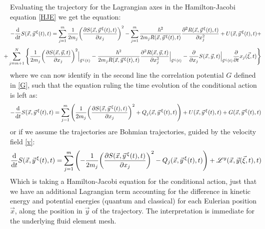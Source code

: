 \documentclass[11pt, a4paper]{article} %
\newcommand{\Lg}{\mathscr{L}}
\begin{document}
Evaluating the trajectory for the Lagrangian axes in the Hamilton-Jacobi equation \eqref{HJE} we get the equation:
\begin{equation}
-\dv{}{t}S(\vec{x}, \vec{y}^{\, \xi}(t),t)=\sum_{j=1}^m\frac{1}{2m_j}\qty(\pdv{S(\vec{x},\vec{y}^{\, \xi}(t),t)}{x_j})^2-\sum_{j=1}^m \frac{\hbar^2}{2m_jR(\vec{x},\vec{y}^{\, \xi}(t),t)}\pdv[2]{R(\vec{x},\vec{y}^{\, \xi}(t),t)}{x_j}+U(\vec{x},\vec{y}^{\, \xi}(t),t)+
\end{equation}
$$
\hspace{-0.4cm} +\sum_{j=m+1}^N\qty{\frac{1}{2m_j}\qty(\pdv{S(\vec{x},\vec{y},t)}{x_j})^2\Big\rvert_{\vec{y}^{\, \xi}(t)}-\frac{\hbar^2}{2m_jR(\vec{x},\vec{y}^{\, \xi}(t),t)}\pdv[2]{R(\vec{x},\vec{y},t)}{x_j}\Big\rvert_{\vec{y}^{\, \xi}(t)}-\pdv{}{x_j}S(\vec{x},\vec{y},t)\Big\rvert_{\vec{y}^{\, \xi}(t)}\pdv{}{t}x_j(\vec{\xi},t)}
$$
where we can now identify in the second line the correlation potential $G$ defined in \eqref{G}, such that the equation ruling the time evolution of the conditional action is left as:
\begin{equation}\label{HJE.EL}
-\dv{}{t}S(\vec{x}, \vec{y}^{\, \xi}(t),t)=\sum_{j=1}^m\qty(\frac{1}{2m_j}\qty(\pdv{S(\vec{x},\vec{y}^{\, \xi}(t),t)}{x_j})^2+Q_j(\vec{x},\vec{y}^{\, \xi}(t),t))+U(\vec{x},\vec{y}^{\, \xi}(t),t)+G(\vec{x},\vec{y}^{\, \xi}(t),t)
\end{equation}
or if we assume the trajectories are Bohmian trajectories, guided by the velocity field \eqref{v}:
\begin{equation}\label{HJE.EL.Bohm}
\dv{}{t}S(\vec{x}, \vec{y}^{\, \xi}(t),t)=\sum_{j=1}^m\qty(-\frac{1}{2m_j}\qty(\pdv{S(\vec{x},\vec{y}^{\, \xi}(t),t)}{x_j})^2-Q_j(\vec{x},\vec{y}^{\, \xi}(t),t))+\Lg^y(\vec{x},\vec{y}(\vec{\xi},t),t) 
\end{equation}
Which is taking a Hamilton-Jacobi equation for the conditional action, just that we have an additional Lagrangian term accounting for the difference in kinetic energy and potential energies (quantum and classical) for each Eulerian position $\vec{x}$, along the position in $\vec{y}$ of the trajectory. The interpretation is immediate for the underlying fluid element mesh.
\end{document}
